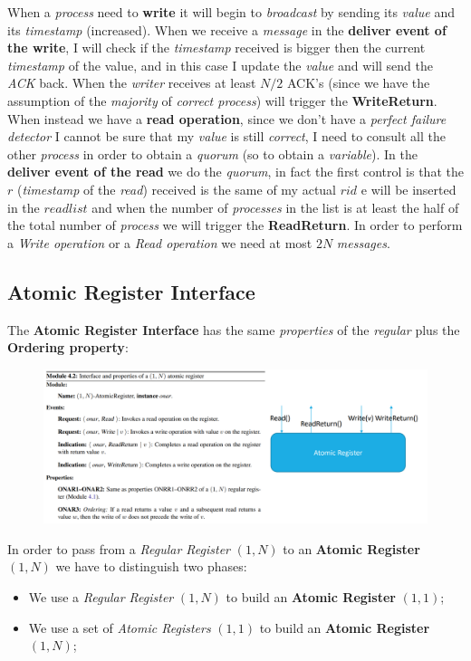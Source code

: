 \documentclass{article}
\begin{document}
When a \emph{process} need to \textbf{write} it will begin to \emph{broadcast} by sending its \emph{value} and its \emph{timestamp} (increased). When we receive a \emph{message} in the \textbf{deliver event of the write}, I will check if the \emph{timestamp} received is bigger then the current \emph{timestamp} of the value, and in this case I update the \emph{value} and will send the \emph{ACK} back. When the \emph{writer} receives at least $N/2$ ACK's (since we have the assumption of the \emph{majority} of \emph{correct process}) will trigger the \textbf{WriteReturn}. When instead we have a \textbf{read operation}, since we don't have a \emph{perfect failure detector} I cannot be sure that my \emph{value} is still \emph{correct}, I need to consult all the other \emph{process} in order to obtain a \emph{quorum} (so to obtain a \emph{variable}). In the \textbf{deliver event of the read} we do the \emph{quorum}, in fact the first control is that the $r$ (\emph{timestamp} of the \emph{read}) received is the same of my actual $rid$ e will be inserted in the $readlist$ and when the number of \emph{processes} in the list is at least the half of the total number of \emph{process} we will trigger the \textbf{ReadReturn}. In order to perform a \emph{Write operation} or a \emph{Read operation} we need at most $2N$ \emph{messages}.
\subsection{Atomic Register Interface}
The \textbf{Atomic Register Interface} has the same \emph{properties} of the \emph{regular} plus the \textbf{Ordering property}:
\begin{figure}[H]
  \centering
  \includegraphics[scale=0.8,left]{cattura70.png}
\end{figure}
In order to pass from a \emph{Regular Register} $(1,N)$ to an \textbf{Atomic Register} $(1,N)$ we have to distinguish two phases:
\begin{itemize}
\item We use a \emph{Regular Register} $(1,N)$ to build an \textbf{Atomic Register} $(1,1)$;
\item We use a set of \emph{Atomic Registers} $(1,1)$ to build an \textbf{Atomic Register} $(1,N)$;
\end{itemize}
\clearpage
\end{document}
